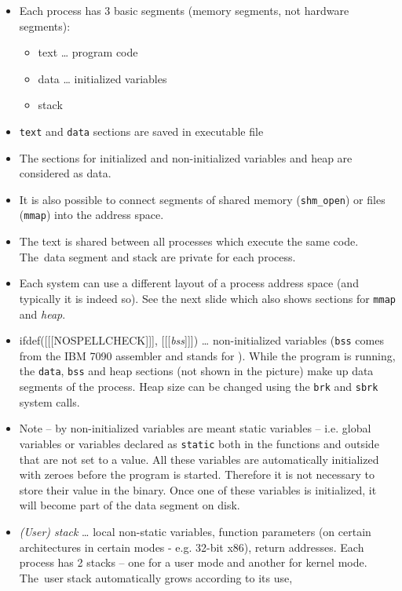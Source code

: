 \begin{itemize}
\item Each process has 3 basic segments (memory segments, not
hardware segments):
    \begin{itemize}
    \item text \dots{} program code
    \item data \dots{} initialized variables
    \item stack
    \end{itemize}
\item \texttt{text} and \texttt{data} sections are saved in executable file
\item The sections for initialized and non-initialized variables and heap are
considered as data.
\item It is also possible to connect segments of shared memory
(\texttt{shm\_open}) or files (\texttt{mmap}) into the address space.
\item The text is shared between all processes which execute the same code.
The~data segment and stack are private for each process.
\item Each system can use a different layout of a process address space
(and typically it is indeed so).  See the next slide which also shows
sections for \texttt{mmap} and \emph{heap}.
\item ifdef([[[NOSPELLCHECK]]], [[[\emph{bss}]]]) \dots{} non-initialized
variables (\texttt{bss} comes from the IBM 7090 assembler and stands for
).
While the program is running, the \texttt{data}, \texttt{bss} and heap
sections (not shown in the picture) make up data segments of the process.
Heap size can be changed using the \texttt{brk} and \texttt{sbrk} system calls.
\item Note -- by non-initialized variables are meant static variables --
i.e. global variables or variables declared as \texttt{static} both in the
functions and outside that are not set to a value.  All these variables are
automatically initialized with zeroes before the program is started. Therefore
it is not necessary to store their value in the binary. Once one of these
variables is initialized, it will become part of the data segment on disk.
\item \emph{(User) stack} \dots{} local non-static variables, function
parameters (on certain architectures in certain modes - e.g. 32-bit x86), return
addresses.  Each process has 2 stacks -- one for a user mode and another for
kernel mode.  The~user stack automatically grows according to its use,

\end{itemize}

